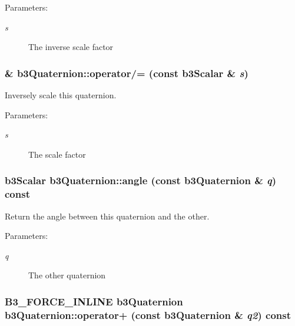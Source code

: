 \begin{Desc}
\item[Parameters:]
\begin{description}
\item[{\em s}]The inverse scale factor \end{description}
\end{Desc}
\hypertarget{classb3_quaternion_293d5a2d8e103d5577a83baa18d4b2b7}{
\subsubsection[operator/=]{\& b3Quaternion::operator/= (const b3Scalar \& {\em s})}}
\label{classb3_quaternion_293d5a2d8e103d5577a83baa18d4b2b7}


Inversely scale this quaternion. 

\begin{Desc}
\item[Parameters:]
\begin{description}
\item[{\em s}]The scale factor \end{description}
\end{Desc}
\hypertarget{classb3_quaternion_cbdc532e53c4319bd2b8c760764a9452}{
\subsubsection[angle]{\setlength{\rightskip}{0pt plus 5cm}b3Scalar b3Quaternion::angle (const {\bf b3Quaternion} \& {\em q}) const}}
\label{classb3_quaternion_cbdc532e53c4319bd2b8c760764a9452}


Return the angle between this quaternion and the other. 

\begin{Desc}
\item[Parameters:]
\begin{description}
\item[{\em q}]The other quaternion \end{description}
\end{Desc}
\hypertarget{classb3_quaternion_67190e0235b14f9d062f8616221665cf}{
\subsubsection[operator+]{\setlength{\rightskip}{0pt plus 5cm}B3\_\-FORCE\_\-INLINE {\bf b3Quaternion} b3Quaternion::operator+ (const {\bf b3Quaternion} \& {\em q2}) const}}
\label{classb3_quaternion_67190e0235b14f9d062f8616221665cf}


